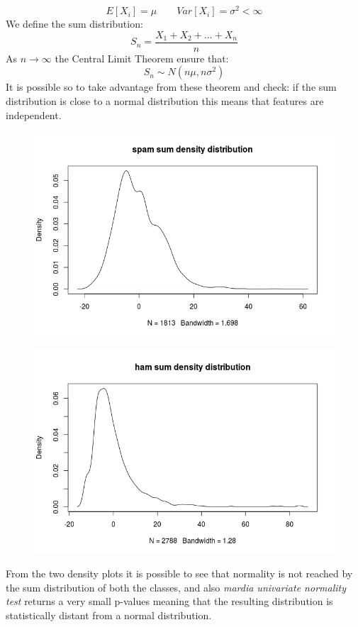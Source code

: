 \documentclass[11pt,a4paper]{article}
\begin{document}
$$
E[X_i] = \mu \qquad Var[X_i] = \sigma^2 < \infty
$$
We define the sum distribution: 
$$
S_n = \frac{X_1 + X_2 + \dots + X_n}{n}
$$
As $n \rightarrow \infty$ the Central Limit Theorem ensure that:
$$S_n \sim N(n\mu, n\sigma^2)$$
It is possible so to take advantage from these theorem and check: if the sum distribution is close to a normal distribution this means that features are independent.


\begin{figure}[!h]
	\begin{minipage}[t]{0.5\linewidth}
		\centering
		\includegraphics[width=1\textwidth]{img/spamSumDistribution.png}
		\label{f1}
	\end{minipage}
	\hspace{0.1cm}
	\begin{minipage}[t]{0.5\linewidth} 
		\centering
		\includegraphics[width=1\textwidth]{img/hamSumDistribution.png}
		\label{f2}
	\end{minipage}        
\end{figure}
From the two density plots it is possible to see that normality is not reached by the sum distribution of both the classes, and also \textit{mardia univariate normality test} returns a very small p-values meaning that the resulting distribution is statistically distant from a normal distribution.
\end{document}
